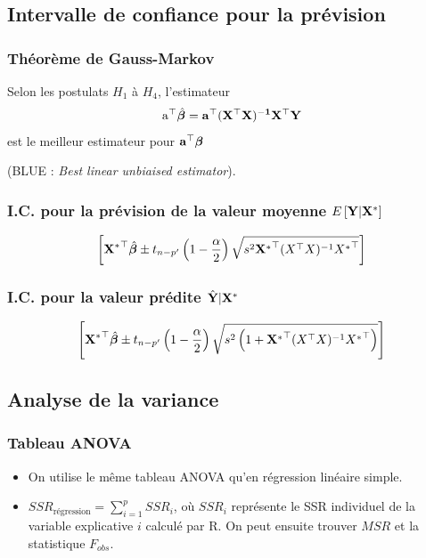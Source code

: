 \documentclass[10pt, french]{article}
\begin{document}
\begin{multicols*}{3}
\subsection*{Intervalle de confiance pour la prévision}
\subsubsection*{Théorème de Gauss-Markov}
Selon les postulats $H_1$ à $H_4$, l'estimateur
\begin{align*}
\mathrm{a^\top} \hat{\bm{\beta}} = \mathbf{a^\top (X^\top X)^{-1} X^\top Y}
\end{align*}
est le meilleur estimateur pour $\mathbf{a^\top} \bm{\beta}$

(BLUE : \textit{Best linear unbiaised estimator}).

\subsubsection*{I.C. pour la prévision de la valeur moyenne $E \left[ \mathbf{Y} | \mathbf{X^*} \right]$}
\begin{align*}
\left[ \mathbf{{X^*}^\top} \hat{\bm{\beta}} \pm t_{n-p'}\left(1 - \frac{\alpha}{2} \right) \sqrt{s^2 \mathbf{{X^*}^\top} (X^\top X)^{-1}{X^*}^\top} \right]
\end{align*}

\subsubsection*{I.C. pour la valeur prédite $\hat{\mathbf{Y}}|\mathbf{X^*}$}
\begin{align*}
\left[ \mathbf{{X^*}^\top} \hat{\bm{\beta}} \pm t_{n-p'}\left(1 - \frac{\alpha}{2} \right) \sqrt{s^2\left( 1 +  \mathbf{{X^*}^\top} (X^\top X)^{-1}{X^*}^\top\right)} \right]
\end{align*}


\subsection*{Analyse de la variance}
\subsubsection*{Tableau ANOVA}
\begin{itemize}
\item On utilise le même tableau ANOVA qu'en régression linéaire simple.
\item $SSR_{\text{régression}} = \sum_{i=1}^{p} SSR_i $, où $SSR_i$ représente le SSR individuel de la variable explicative $i$ calculé par R. On peut ensuite trouver $MSR$ et la statistique $F_{obs}$.
\end{itemize}


\end{multicols*}
\end{document}
